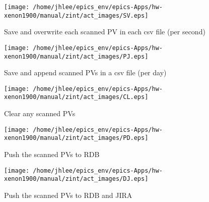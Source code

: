 \noindent
\vspace{1.4cm}
\begin{minipage}{.2\textwidth}
\begin{center}
\texttt{[image: /home/jhlee/epics\_env/epics-Apps/hw-xenon1900/manual/zint/act\_images/SV.eps]}
\end{center}
\end{minipage}
\begin{minipage}{.7\textwidth}
Save and overwrite each scanned PV in each csv file (per second)
\end{minipage}


\noindent
\vspace{1.4cm}
\begin{minipage}{.2\textwidth}
\begin{center}
\texttt{[image: /home/jhlee/epics\_env/epics-Apps/hw-xenon1900/manual/zint/act\_images/PJ.eps]}
\end{center}
\end{minipage}
\begin{minipage}{.7\textwidth}
Save and append scanned PVs in a csv file (per day)
\end{minipage}


\noindent
\vspace{1.4cm}
\begin{minipage}{.2\textwidth}
\begin{center}
\texttt{[image: /home/jhlee/epics\_env/epics-Apps/hw-xenon1900/manual/zint/act\_images/CL.eps]}
\end{center}
\end{minipage}
\begin{minipage}{.7\textwidth}
Clear any scanned PVs
\end{minipage}


\noindent
\vspace{1.4cm}
\begin{minipage}{.2\textwidth}
\begin{center}
\texttt{[image: /home/jhlee/epics\_env/epics-Apps/hw-xenon1900/manual/zint/act\_images/PD.eps]}
\end{center}
\end{minipage}
\begin{minipage}{.7\textwidth}
Push the scanned PVs to RDB
\end{minipage}


\noindent
\vspace{1.4cm}
\begin{minipage}{.2\textwidth}
\begin{center}
\texttt{[image: /home/jhlee/epics\_env/epics-Apps/hw-xenon1900/manual/zint/act\_images/DJ.eps]}
\end{center}
\end{minipage}
\begin{minipage}{.7\textwidth}
Push the scanned PVs to RDB and JIRA
\end{minipage}


